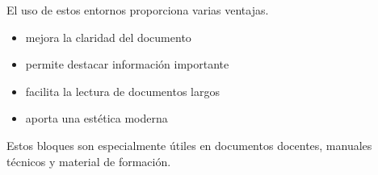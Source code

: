 El uso de estos entornos proporciona varias ventajas.

\begin{itemize}

\item mejora la claridad del documento
\item permite destacar información importante
\item facilita la lectura de documentos largos
\item aporta una estética moderna

\end{itemize}



\begin{notebox}
Estos bloques son especialmente útiles en documentos
docentes, manuales técnicos y material de formación.
\end{notebox}
